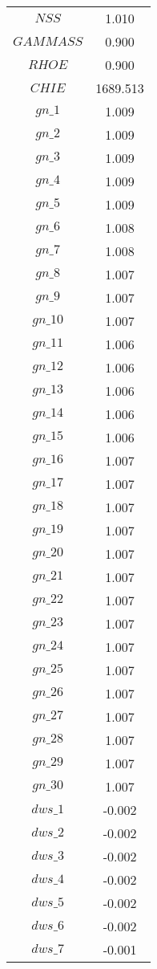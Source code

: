 \begin{center}
\begin{longtable}{cc}
$NSS$ 	 & 	 1.010 \\
$GAMMASS$ 	 & 	 0.900 \\
$RHOE$ 	 & 	 0.900 \\
$CHIE$ 	 & 	 1689.513 \\
$gn\_1$ 	 & 	 1.009 \\
$gn\_2$ 	 & 	 1.009 \\
$gn\_3$ 	 & 	 1.009 \\
$gn\_4$ 	 & 	 1.009 \\
$gn\_5$ 	 & 	 1.009 \\
$gn\_6$ 	 & 	 1.008 \\
$gn\_7$ 	 & 	 1.008 \\
$gn\_8$ 	 & 	 1.007 \\
$gn\_9$ 	 & 	 1.007 \\
$gn\_10$ 	 & 	 1.007 \\
$gn\_11$ 	 & 	 1.006 \\
$gn\_12$ 	 & 	 1.006 \\
$gn\_13$ 	 & 	 1.006 \\
$gn\_14$ 	 & 	 1.006 \\
$gn\_15$ 	 & 	 1.006 \\
$gn\_16$ 	 & 	 1.007 \\
$gn\_17$ 	 & 	 1.007 \\
$gn\_18$ 	 & 	 1.007 \\
$gn\_19$ 	 & 	 1.007 \\
$gn\_20$ 	 & 	 1.007 \\
$gn\_21$ 	 & 	 1.007 \\
$gn\_22$ 	 & 	 1.007 \\
$gn\_23$ 	 & 	 1.007 \\
$gn\_24$ 	 & 	 1.007 \\
$gn\_25$ 	 & 	 1.007 \\
$gn\_26$ 	 & 	 1.007 \\
$gn\_27$ 	 & 	 1.007 \\
$gn\_28$ 	 & 	 1.007 \\
$gn\_29$ 	 & 	 1.007 \\
$gn\_30$ 	 & 	 1.007 \\
$dws\_1$ 	 & 	 -0.002 \\
$dws\_2$ 	 & 	 -0.002 \\
$dws\_3$ 	 & 	 -0.002 \\
$dws\_4$ 	 & 	 -0.002 \\
$dws\_5$ 	 & 	 -0.002 \\
$dws\_6$ 	 & 	 -0.002 \\
$dws\_7$ 	 & 	 -0.001 \\

\end{longtable}
\end{center}

